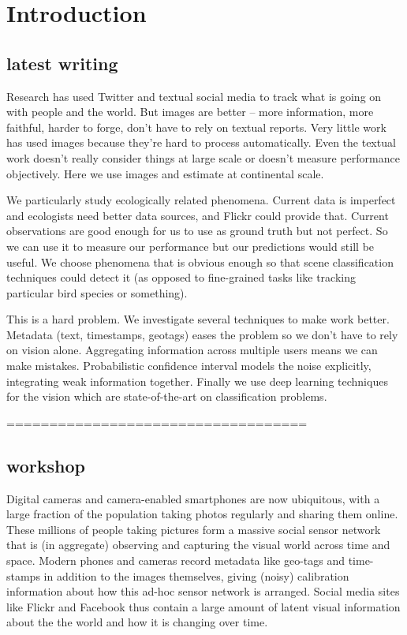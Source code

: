 \section{Introduction}

\hfill \break
\hfill \break
\subsection*{latest writing}
\hfill \break
\hfill \break

Research has used Twitter and textual social media to track what is going on with people and the world. But images are better -- more information, more faithful, harder to forge, don't have to rely on textual reports. Very little work has used images because they're hard to process automatically. Even the textual work doesn't really consider things at large scale or doesn't measure performance objectively. Here we use images and estimate at continental scale.

We particularly study ecologically related phenomena. Current data is imperfect and ecologists need better data sources, and Flickr could provide that. Current observations are good enough for us to use as ground truth but not perfect. So we can use it to measure our performance but our predictions would still be useful. We choose phenomena that is obvious enough so that scene classification techniques could detect it (as opposed to fine-grained tasks like tracking particular bird species or something).

This is a hard problem. We investigate several techniques to make work better. Metadata (text, timestamps, geotags) eases the problem so we don't have to rely on vision alone. Aggregating information across multiple users means we can make mistakes. Probabilistic confidence interval models the noise explicitly, integrating weak information together. Finally we use deep learning techniques for the vision which are state-of-the-art on classification problems.

\hfill \break
\hfill \break
===================================
\hfill \break
\hfill \break
\subsection*{workshop}

Digital cameras and camera-enabled smartphones are now ubiquitous,
with a large fraction of the population taking photos regularly and
sharing them online. These millions of people taking pictures form a
massive social sensor network that is (in aggregate)
observing and capturing the visual world across time and space.
Modern phones and cameras record metadata like geo-tags and
time-stamps in addition to the images themselves, giving (noisy)
calibration information about how this ad-hoc sensor network is arranged.
%
Social media sites like Flickr and Facebook
thus contain a large amount of latent visual information about
the the world and how it is changing over time. 

